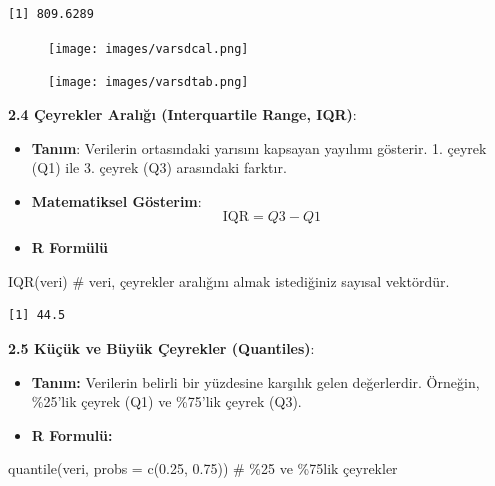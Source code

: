 \documentclass[
  letterpaper,
  DIV=11,
  numbers=noendperiod]{scrartcl}
\newenvironment{Shaded}{\begin{snugshade}}{\end{snugshade}}
\newcommand{\AttributeTok}[1]{\textcolor[rgb]{0.40,0.45,0.13}{#1}}
\newcommand{\CommentTok}[1]{\textcolor[rgb]{0.37,0.37,0.37}{#1}}
\newcommand{\FloatTok}[1]{\textcolor[rgb]{0.68,0.00,0.00}{#1}}
\newcommand{\FunctionTok}[1]{\textcolor[rgb]{0.28,0.35,0.67}{#1}}
\newcommand{\NormalTok}[1]{\textcolor[rgb]{0.00,0.23,0.31}{#1}}
\begin{document}
\begin{verbatim}
[1] 809.6289
\end{verbatim}

\begin{figure}

{\centering \texttt{[image: images/varsdcal.png]}

}

\end{figure}

\begin{figure}

{\centering \texttt{[image: images/varsdtab.png]}

}

\end{figure}

\textbf{2.4 Çeyrekler Aralığı (Interquartile Range, IQR)}:

\begin{itemize}
\item
  \textbf{Tanım}: Verilerin ortasındaki yarısını kapsayan yayılımı
  gösterir. 1. çeyrek (Q1) ile 3. çeyrek (Q3) arasındaki farktır.
\item
  \textbf{Matematiksel Gösterim}: \[ \text{IQR} = Q3 - Q1 \]
\item
  \textbf{R Formülü}
\end{itemize}

\begin{Shaded}
\begin{Highlighting}[]
\FunctionTok{IQR}\NormalTok{(veri)  }\CommentTok{\# veri, çeyrekler aralığını almak istediğiniz sayısal vektördür.}
\end{Highlighting}
\end{Shaded}

\begin{verbatim}
[1] 44.5
\end{verbatim}

\textbf{2.5 Küçük ve Büyük Çeyrekler (Quantiles)}:

\begin{itemize}
\item
  \textbf{Tanım:} Verilerin belirli bir yüzdesine karşılık gelen
  değerlerdir. Örneğin, \%25'lik çeyrek (Q1) ve \%75'lik çeyrek (Q3).
\item
  \textbf{R Formulü:}
\end{itemize}

\begin{Shaded}
\begin{Highlighting}[]
\FunctionTok{quantile}\NormalTok{(veri, }\AttributeTok{probs =} \FunctionTok{c}\NormalTok{(}\FloatTok{0.25}\NormalTok{, }\FloatTok{0.75}\NormalTok{))  }\CommentTok{\# \%25 ve \%75\textquotesingle{}lik çeyrekler}
\end{Highlighting}
\end{Shaded}
\end{document}
